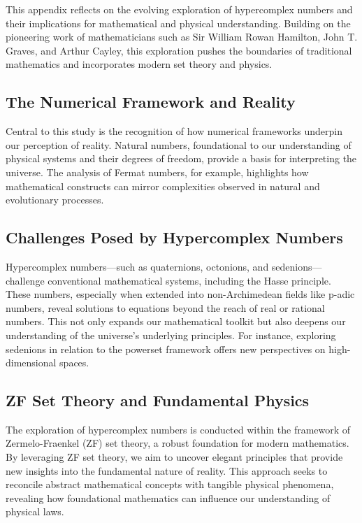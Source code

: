 \documentclass[12pt]{article}
\begin{document}
This appendix reflects on the evolving exploration of hypercomplex numbers and their implications for mathematical and physical understanding. Building on the pioneering work of mathematicians such as Sir William Rowan Hamilton, John T. Graves, and Arthur Cayley, this exploration pushes the boundaries of traditional mathematics and incorporates modern set theory and physics.

\subsection{The Numerical Framework and Reality}

Central to this study is the recognition of how numerical frameworks underpin our perception of reality. Natural numbers, foundational to our understanding of physical systems and their degrees of freedom, provide a basis for interpreting the universe. The analysis of Fermat numbers, for example, highlights how mathematical constructs can mirror complexities observed in natural and evolutionary processes.

\subsection{Challenges Posed by Hypercomplex Numbers}

Hypercomplex numbers—such as quaternions, octonions, and sedenions—challenge conventional mathematical systems, including the Hasse principle. These numbers, especially when extended into non-Archimedean fields like p-adic numbers, reveal solutions to equations beyond the reach of real or rational numbers. This not only expands our mathematical toolkit but also deepens our understanding of the universe’s underlying principles. For instance, exploring sedenions in relation to the powerset framework offers new perspectives on high-dimensional spaces.

\subsection{ZF Set Theory and Fundamental Physics}

The exploration of hypercomplex numbers is conducted within the framework of Zermelo-Fraenkel (ZF) set theory, a robust foundation for modern mathematics. By leveraging ZF set theory, we aim to uncover elegant principles that provide new insights into the fundamental nature of reality. This approach seeks to reconcile abstract mathematical concepts with tangible physical phenomena, revealing how foundational mathematics can influence our understanding of physical laws.
\end{document}
